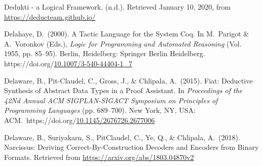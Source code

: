 \documentclass[12pt,twoside]{article}
\begin{document}
{\begin{thebibliography}{1079}
\mdbibitemlabel{}Dedukti - a Logical Framework. (n.d.). Retrieved January 10, 2020, from \href{https://deducteam.github.io/}{{\ttfamily https://\hspace{0pt}deducteam.\hspace{0pt}github.\hspace{0pt}io/\hspace{0pt}}}%

\mdbibitemlabel{}Delahaye, D.~(2000). A Tactic Language for the System Coq. In M.~Parigot \& A.~Voronkov (Eds.), \emph{Logic for Programming and Automated Reasoning} (Vol. 1955, pp. 85–95). Berlin, Heidelberg: Springer Berlin Heidelberg. https://doi.org/\href{https://dx.doi.org/10.1007/3-540-44404-1_7}{10.1007/3-540-44404-1\_7}%

\mdbibitemlabel{}Delaware, B., Pit-Claudel, C., Gross, J., \& Chlipala, A.~(2015). Fiat: Deductive Synthesis of Abstract Data Types in a Proof Assistant. In \emph{Proceedings of the 42Nd Annual ACM SIGPLAN-SIGACT Symposium on Principles of Programming Languages} (pp. 689–700). New York, NY, USA: ACM.~https://doi.org/\href{https://dx.doi.org/10.1145/2676726.2677006}{10.1145/2676726.2677006}%

\mdbibitemlabel{}Delaware, B., Suriyakarn, S., Pit\textendash{}Claudel, C., Ye, Q., \& Chlipala, A.~(2018). Narcissus: Deriving Correct-By-Construction Decoders and Encoders from Binary Formats. Retrieved from \href{https://arxiv.org/abs/1803.04870v2}{{\ttfamily https://\hspace{0pt}arxiv.\hspace{0pt}org/\hspace{0pt}abs/\hspace{0pt}1803.\hspace{0pt}04870v2}}%


\end{thebibliography}}
\end{document}
